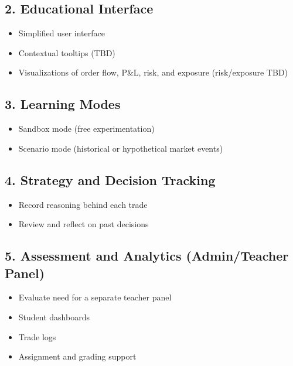 \documentclass[12pt]{article}
\begin{document}
\subsection*{2. Educational Interface}
\begin{itemize}
    \item Simplified user interface
    \item Contextual tooltips (TBD)
    \item Visualizations of order flow, P\&L, risk, and exposure (risk/exposure TBD)
\end{itemize}

\subsection*{3. Learning Modes}
\begin{itemize}
    \item Sandbox mode (free experimentation)
    \item Scenario mode (historical or hypothetical market events)
\end{itemize}

\subsection*{4. Strategy and Decision Tracking}
\begin{itemize}
    \item Record reasoning behind each trade
    \item Review and reflect on past decisions
\end{itemize}

\subsection*{5. Assessment and Analytics (Admin/Teacher Panel)}
\begin{itemize}
    \item Evaluate need for a separate teacher panel
    \item Student dashboards
    \item Trade logs
    \item Assignment and grading support
\end{itemize}
\end{document}
